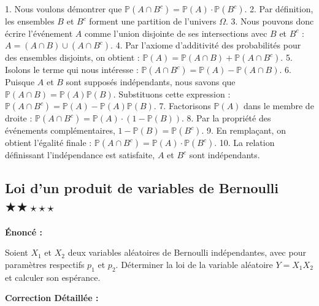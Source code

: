 \documentclass[11pt,a4paper]{article}
\begin{document}
1. Nous voulons démontrer que $\mathbb{P}(A \cap B^c) = \mathbb{P}(A) \cdot \mathbb{P}(B^c)$.
2. Par définition, les ensembles $B$ et $B^c$ forment une partition de l'univers $\Omega$.
3. Nous pouvons donc écrire l'événement $A$ comme l'union disjointe de ses intersections avec $B$ et $B^c$ : $A = (A \cap B) \cup (A \cap B^c)$.
4. Par l'axiome d'additivité des probabilités pour des ensembles disjoints, on obtient :
   $\mathbb{P}(A) = \mathbb{P}(A \cap B) + \mathbb{P}(A \cap B^c)$.
5. Isolons le terme qui nous intéresse :
   $\mathbb{P}(A \cap B^c) = \mathbb{P}(A) - \mathbb{P}(A \cap B)$.
6. Puisque $A$ et $B$ sont supposés indépendants, nous savons que $\mathbb{P}(A \cap B) = \mathbb{P}(A)\mathbb{P}(B)$. Substituons cette expression :
   $\mathbb{P}(A \cap B^c) = \mathbb{P}(A) - \mathbb{P}(A)\mathbb{P}(B)$.
7. Factorisons $\mathbb{P}(A)$ dans le membre de droite :
   $\mathbb{P}(A \cap B^c) = \mathbb{P}(A) \cdot (1 - \mathbb{P}(B))$.
8. Par la propriété des événements complémentaires, $1 - \mathbb{P}(B) = \mathbb{P}(B^c)$.
9. En remplaçant, on obtient l'égalité finale :
   $\mathbb{P}(A \cap B^c) = \mathbb{P}(A) \cdot \mathbb{P}(B^c)$.
10. La relation définissant l'indépendance est satisfaite, $A$ et $B^c$ sont indépendants.


\subsection*{ Loi d'un produit de variables de Bernoulli \quad $\bigstar\bigstar\star\star\star$}

\textbf{Énoncé :}

Soient $X_1$ et $X_2$ deux variables aléatoires de Bernoulli indépendantes, avec pour paramètres respectifs $p_1$ et $p_2$.
Déterminer la loi de la variable aléatoire $Y = X_1 X_2$ et calculer son espérance.

\textbf{Correction Détaillée :}
\end{document}
